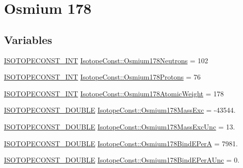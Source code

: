 \hypertarget{group___isotope_const-_osmium-_os178}{}\section{Osmium 178}
\label{group___isotope_const-_osmium-_os178}
\subsection*{Variables}
\begin{DoxyCompactItemize}
\item 
\mbox{\hyperlink{group___isotope_const-_macros_ga5f18360b3e99483a35c32d789e62621c}{I\+S\+O\+T\+O\+P\+E\+C\+O\+N\+S\+T\+\_\+\+I\+NT}} \mbox{\hyperlink{group___isotope_const-_osmium-_os178_gae5d342ef2cdcb27e081d0bf5a58ff7ec}{Isotope\+Const\+::\+Osmium178\+Neutrons}} = 102
\item 
\mbox{\hyperlink{group___isotope_const-_macros_ga5f18360b3e99483a35c32d789e62621c}{I\+S\+O\+T\+O\+P\+E\+C\+O\+N\+S\+T\+\_\+\+I\+NT}} \mbox{\hyperlink{group___isotope_const-_osmium-_os178_gaff091ee594e1d6b12a9a0aa227bfe575}{Isotope\+Const\+::\+Osmium178\+Protons}} = 76
\item 
\mbox{\hyperlink{group___isotope_const-_macros_ga5f18360b3e99483a35c32d789e62621c}{I\+S\+O\+T\+O\+P\+E\+C\+O\+N\+S\+T\+\_\+\+I\+NT}} \mbox{\hyperlink{group___isotope_const-_osmium-_os178_ga2e560eb5c1f3d6c7be15adb9d0736395}{Isotope\+Const\+::\+Osmium178\+Atomic\+Weight}} = 178
\item 
\mbox{\hyperlink{group___isotope_const-_macros_ga8f45a7272ce02c0b4c65c44636ed719a}{I\+S\+O\+T\+O\+P\+E\+C\+O\+N\+S\+T\+\_\+\+D\+O\+U\+B\+LE}} \mbox{\hyperlink{group___isotope_const-_osmium-_os178_ga3fe1b61626be9376e314c0d74ab0f168}{Isotope\+Const\+::\+Osmium178\+Mass\+Exc}} = -\/43544.
\item 
\mbox{\hyperlink{group___isotope_const-_macros_ga8f45a7272ce02c0b4c65c44636ed719a}{I\+S\+O\+T\+O\+P\+E\+C\+O\+N\+S\+T\+\_\+\+D\+O\+U\+B\+LE}} \mbox{\hyperlink{group___isotope_const-_osmium-_os178_ga2f8761f1ff5ab78b57621566d653f910}{Isotope\+Const\+::\+Osmium178\+Mass\+Exc\+Unc}} = 13.
\item 
\mbox{\hyperlink{group___isotope_const-_macros_ga8f45a7272ce02c0b4c65c44636ed719a}{I\+S\+O\+T\+O\+P\+E\+C\+O\+N\+S\+T\+\_\+\+D\+O\+U\+B\+LE}} \mbox{\hyperlink{group___isotope_const-_osmium-_os178_ga83a95839ff5a6244e7f753bb9f652c50}{Isotope\+Const\+::\+Osmium178\+Bind\+E\+PerA}} = 7981.
\item 
\mbox{\hyperlink{group___isotope_const-_macros_ga8f45a7272ce02c0b4c65c44636ed719a}{I\+S\+O\+T\+O\+P\+E\+C\+O\+N\+S\+T\+\_\+\+D\+O\+U\+B\+LE}} \mbox{\hyperlink{group___isotope_const-_osmium-_os178_gaa77fdc4bafae6fa12e1ec968f3695aed}{Isotope\+Const\+::\+Osmium178\+Bind\+E\+Per\+A\+Unc}} = 0.

\end{DoxyCompactItemize}
